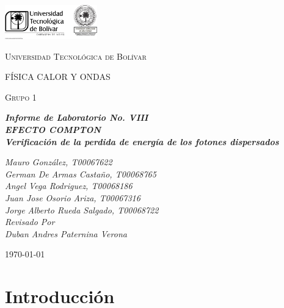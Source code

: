 \documentclass[letterpaper, 12pt]{article}
\begin{document}
\begin{titlepage}
      \centering
      \includegraphics[width=0.3\textwidth]{Images/logo_utb.png}\par\vspace{1cm}
      {\scshape\LARGE Universidad Tecnológica de Bolívar \par}
      \vspace{.5cm}

      {\scshape\Large FÍSICA CALOR Y ONDAS \par}
      \vspace{.2cm}

      {\scshape\Large Grupo 1 \par}
      \vspace{.5cm}
      \slshape {\Large \bfseries{}Informe de Laboratorio No. VIII\\}
      \slshape {\small \bfseries{}EFECTO COMPTON \\ {Verificación de la perdida de energía de los fotones dispersados}}
      \vspace{1cm}

      \slshape {\itshape{} Mauro González, T00067622 \\}
      \slshape {\itshape{} German De Armas Castaño, T00068765 \\}
      \slshape {\itshape{} Angel Vega Rodriguez, T00068186 \\}
      \slshape {\itshape{} Juan Jose Osorio Ariza, T00067316 \\}
      \slshape {\itshape{} Jorge Alberto Rueda Salgado, T00068722 \\}
      \vfill
      Revisado Por \\
      Duban Andres Paternina Verona\\
      {\large \today\par}
\end{titlepage}


\section{Introducción}
\end{document}

